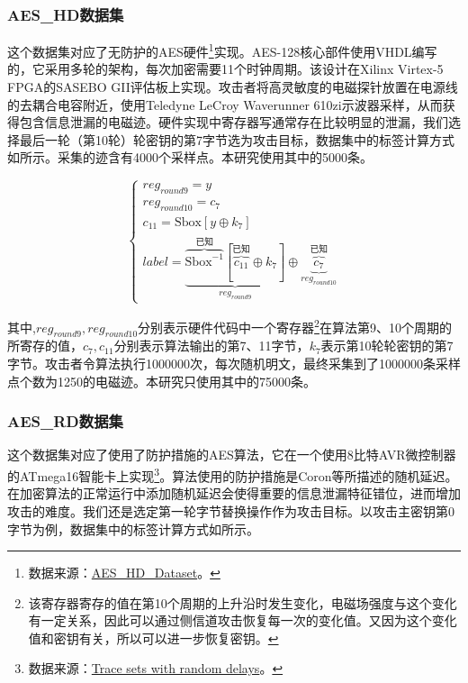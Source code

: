 {	\subsubsection{AES\_HD数据集}
	这个数据集对应了无防护的AES硬件\footnote{数据来源：\href{https://github.com/AESHD/AES\_HD\_Dataset}{AES\_HD\_Dataset}。}实现。AES-128核心部件使用VHDL编写的，它采用多轮的架构，每次加密需要11个时钟周期。该设计在Xilinx Virtex-5 FPGA的SASEBO GII评估板上实现。攻击者将高灵敏度的电磁探针放置在电源线的去耦合电容附近，使用Teledyne LeCroy Waverunner 610zi示波器采样，从而获得包含信息泄漏的电磁迹。硬件实现中寄存器写通常存在比较明显的泄漏，我们选择最后一轮（第10轮）轮密钥的第7字节选为攻击目标，数据集中的标签计算方式如所示。采集的迹含有4000个采样点。本研究使用其中的5000条。
	
	\begin{equation}
		\begin{cases}
			reg_{round9}=y\\
			reg_{round10}=c_{7}\\
			c_{11}=\mathrm{Sbox}[y\oplus k_7]\\
			label =\underbrace{\overbrace{\mathrm{Sbox}^{-1}}^{\mbox{已知}}[\overbrace{c_{11}}^{\mbox{已知}}\oplus k_{7}]}_{reg_{round9}}\oplus \underbrace{\overbrace{c_{7}}^{\mbox{已知}}}_{reg_{round10}}
		\end{cases}\label{eq:aeshdmodel}
	\end{equation}
	
	\noindent 其中,$reg_{round9},reg_{round10}$分别表示硬件代码中一个寄存器\footnote{该寄存器寄存的值在第10个周期的上升沿时发生变化，电磁场强度与这个变化有一定关系，因此可以通过侧信道攻击恢复每一次的变化值。又因为这个变化值和密钥有关，所以可以进一步恢复密钥。}在算法第9、10个周期的所寄存的值，$c_7,c_{11}$分别表示算法输出的第7、11字节，$k_7$表示第10轮轮密钥的第7字节。攻击者令算法执行1000000次，每次随机明文，最终采集到了1000000条采样点个数为1250的电磁迹。本研究只使用其中的75000条。
	\subsubsection{AES\_RD数据集}
	这个数据集对应了使用了防护措施的AES算法，它在一个使用8比特AVR微控制器的ATmega16智能卡上实现\footnote{数据来源：\href{https://github.com/ikizhvatov/randomdelays-traces}{Trace sets with random delays}。}。算法使用的防护措施是Coron等\citep{Coron09}所描述的随机延迟。在加密算法的正常运行中添加随机延迟会使得重要的信息泄漏特征错位，进而增加攻击的难度。我们还是选定第一轮字节替换操作作为攻击目标。以攻击主密钥第0字节为例，数据集中的标签计算方式如所示。
	
}
